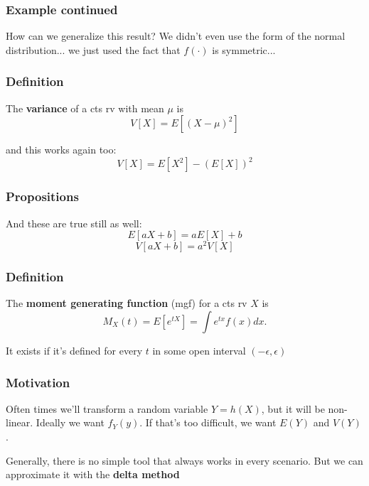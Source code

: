\documentclass{beamer}
\begin{document}


\begin{frame}
\frametitle{Example continued}

How can we generalize this result? We didn't even use the form of the normal distribution... we just used the fact that $f(\cdot)$ is symmetric...

\end{frame}




\begin{frame}
\frametitle{Definition}

The \textbf{variance} of a cts rv with mean $\mu$ is
\[
V[X] = E[(X-\mu)^2]
\]

and this works again too:
\[
V[X] = E[X^2] - (E[X])^2
\]
\end{frame}



\begin{frame}
\frametitle{Propositions}

And these are true still as well:
\[
E[aX + b] = aE[X] + b
\]
\[
V[aX + b] = a^2 V[X] 
\]

\end{frame}



\begin{frame}
\frametitle{Definition}

\begin{definition}
The \textbf{moment generating function} (mgf) for a cts rv $X$ is 
\[
M_X(t) = E[e^{tX}] = \int e^{tx} f(x) dx.
\]
\end{definition}

It exists if it's defined for every $t$ in some open interval $(- \epsilon, \epsilon)$

\end{frame}



\begin{frame}
\frametitle{Motivation}

Often times we'll transform a random variable $Y = h(X)$, but it will be non-linear. Ideally we want $f_Y(y)$. If that's too difficult, we want $E(Y)$ and $V(Y)$.
\newline

Generally, there is no simple tool that always works in every scenario. But we can approximate it with the \textbf{delta method}
\end{frame}
\end{document}
